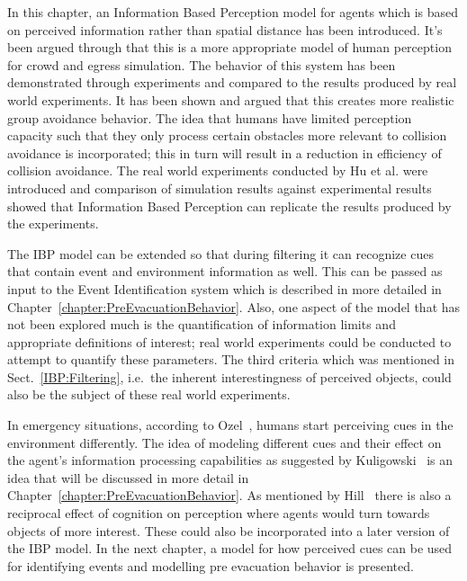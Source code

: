 In this chapter, an Information Based Perception model for agents which is based on perceived information rather than spatial distance has been introduced. It's been argued through that this is a more appropriate model of human perception for crowd and egress simulation. The behavior of this system has been demonstrated through experiments and compared to the results produced by real world experiments. It has been shown and argued that this creates more realistic group avoidance behavior. The idea that humans have limited perception capacity such that they only process certain obstacles more relevant to collision avoidance is incorporated; this in turn will result in a reduction in efficiency of collision avoidance. The real world experiments conducted by Hu et al. were introduced and comparison of simulation results against experimental results showed that Information Based Perception can replicate the results produced by the experiments.



The IBP model can be extended so that during filtering it can recognize cues that contain event and environment information as well. This can be passed as input to the Event Identification system which is described in more detailed in Chapter~\ref{chapter:PreEvacuationBehavior}. Also, one aspect of the model that has not been explored much is the quantification of information limits and appropriate definitions of interest; real world experiments could be conducted to attempt to quantify these parameters. The third criteria which was mentioned in Sect.~\ref{IBP:Filtering}, i.e.\ the inherent interestingness of perceived objects, could also be the subject of these real world experiments.

In emergency situations, according to Ozel~\cite{Ozel:2001tn}, humans start perceiving cues in the environment differently. The idea of modeling different cues and their effect on the agent's information processing capabilities as suggested by Kuligowski~\cite{Kuligowski:2009un} is an idea that will be discussed in more detail in Chapter~\ref{chapter:PreEvacuationBehavior}. As mentioned by Hill~\cite{Hill:1999ww} there is also a reciprocal effect of cognition on perception where agents would turn towards objects of more interest. These could also be incorporated into a later version of the IBP model. In the next chapter, a model for how perceived cues can be used for identifying events and modelling pre evacuation behavior is presented.

